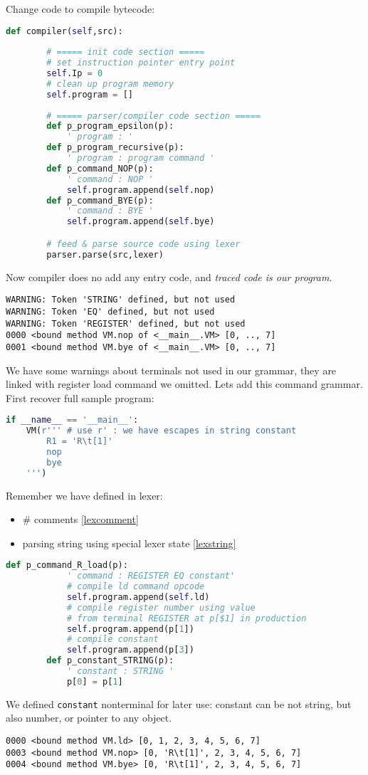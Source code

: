 Change code to compile bytecode:
\begin{lstlisting}[language=python]
	def compiler(self,src):	
	
		# ===== init code section =====
		# set instruction pointer entry point
		self.Ip = 0							
		# clean up program memory
		self.program = []
		
		# ===== parser/compiler code section =====
		def p_program_epsilon(p):
			' program : '
		def p_program_recursive(p):
			' program : program command '
		def p_command_NOP(p):
			' command : NOP '
			self.program.append(self.nop)
		def p_command_BYE(p):
			' command : BYE '
			self.program.append(self.bye)

		# feed & parse source code using lexer
		parser.parse(src,lexer)				
\end{lstlisting}
Now compiler does no add any entry code, and \emph{traced code is our program}.
\begin{lstlisting}
WARNING: Token 'STRING' defined, but not used
WARNING: Token 'EQ' defined, but not used
WARNING: Token 'REGISTER' defined, but not used
0000 <bound method VM.nop of <__main__.VM> [0, .., 7]
0001 <bound method VM.bye of <__main__.VM> [0, .., 7]
\end{lstlisting}
We have some warnings about terminals not used in our grammar, they are linked
with register load command we omitted. Lets add this command grammar. First
recover full sample program:
\begin{lstlisting}[language=python]
if __name__ == '__main__':
	VM(r''' # use r' : we have escapes in string constant
 		R1 = 'R\t[1]'
        nop
        bye
	''')
\end{lstlisting}
Remember we have defined in lexer:
\begin{itemize}
  \item \# comments \ref{lexcomment}
  \item parsing string using special lexer state \ref{lexstring} 
\end{itemize}
\begin{lstlisting}[language=python]
		def p_command_R_load(p):
			' command : REGISTER EQ constant'
			# compile ld command opcode
			self.program.append(self.ld)
			# compile register number using value
			# from terminal REGISTER at p[$1] in production
			self.program.append(p[1])
			# compile constant
			self.program.append(p[3])
		def p_constant_STRING(p):
			' constant : STRING '
			p[0] = p[1]
\end{lstlisting}
We defined \verb|constant| nonterminal for later use: constant can be not
string, but also number, or pointer to any object.
\clearpage
\begin{lstlisting}
0000 <bound method VM.ld> [0, 1, 2, 3, 4, 5, 6, 7]
0003 <bound method VM.nop> [0, 'R\t[1]', 2, 3, 4, 5, 6, 7]
0004 <bound method VM.bye> [0, 'R\t[1]', 2, 3, 4, 5, 6, 7]
\end{lstlisting}


